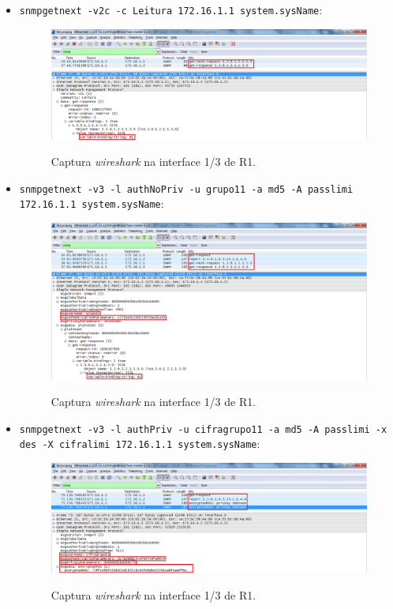 \begin{itemize}

\item \texttt{snmpgetnext -v2c -c Leitura 172.16.1.1 system.sysName}:

\begin{figure}[h]
\centering
\includegraphics[width=1\textwidth, height=0.28\textheight]{8a1.png}
\label{fig:14-capturaWireshark}
\caption{Captura \emph{wireshark} na interface \textsf{1/3} de \textsf{R1}.}
\end{figure}


\item \texttt{snmpgetnext -v3 -l authNoPriv -u grupo11 -a md5 -A passlimi 172.16.1.1 system.sysName}:

\begin{figure}[h]
\centering
\includegraphics[width=1\textwidth, height=0.35\textheight]{8a2.png}
\label{fig:15-capturaWireshark}
\caption{Captura \emph{wireshark} na interface \textsf{1/3} de \textsf{R1}.}
\end{figure}


\item \texttt{snmpgetnext -v3 -l authPriv -u cifragrupo11 -a md5 -A passlimi -x des -X cifralimi 172.16.1.1 system.sysName}:

\begin{figure}[h]
\centering
\includegraphics[width=1\textwidth, height=0.3\textheight]{8a3.png}
\label{fig:16-capturaWireshark}
\caption{Captura \emph{wireshark} na interface \textsf{1/3} de \textsf{R1}.}
\end{figure}

\end{itemize}


